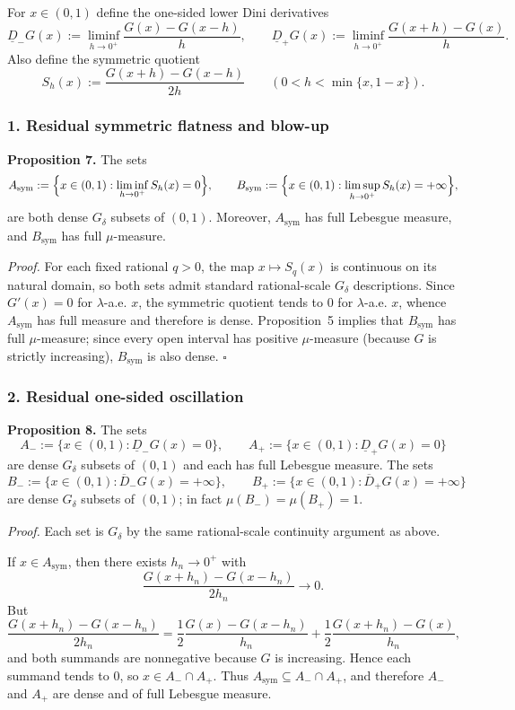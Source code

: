 For $x\in(0,1)$ define the one-sided lower Dini derivatives
\[
\underline D_-G(x):=\liminf_{h\to0^+}\frac{G(x)-G(x-h)}{h},
\qquad
\underline D_+G(x):=\liminf_{h\to0^+}\frac{G(x+h)-G(x)}{h}.
\]
Also define the symmetric quotient
\[
S_h(x):=\frac{G(x+h)-G(x-h)}{2h}
\qquad(0<h<\min\{x,1-x\}).
\]

\subsubsection*{1. Residual symmetric flatness and blow-up}

\noindent\textbf{Proposition 7.}
The sets
\[
A_{\mathrm{sym}}:=\Bigl\{x\in(0,1):\liminf_{h\to0^+}S_h(x)=0\Bigr\},
\qquad
B_{\mathrm{sym}}:=\Bigl\{x\in(0,1):\limsup_{h\to0^+}S_h(x)=+\infty\Bigr\},
\]
are both dense $G_\delta$ subsets of $(0,1)$. Moreover, $A_{\mathrm{sym}}$ has full Lebesgue measure, and $B_{\mathrm{sym}}$ has full $\mu$-measure.

\medskip
\noindent\textit{Proof.}
For each fixed rational $q>0$, the map $x\mapsto S_q(x)$ is continuous on its natural domain, so both sets admit standard rational-scale $G_\delta$ descriptions. Since $G'(x)=0$ for $\lambda$-a.e. $x$, the symmetric quotient tends to $0$ for $\lambda$-a.e. $x$, whence $A_{\mathrm{sym}}$ has full measure and therefore is dense. Proposition~5 implies that $B_{\mathrm{sym}}$ has full $\mu$-measure; since every open interval has positive $\mu$-measure (because $G$ is strictly increasing), $B_{\mathrm{sym}}$ is also dense. \hfill$\square$

\subsubsection*{2. Residual one-sided oscillation}

\noindent\textbf{Proposition 8.}
The sets
\[
A_-:=\{x\in(0,1):\underline D_-G(x)=0\},
\qquad
A_+:=\{x\in(0,1):\underline D_+G(x)=0\}
\]
are dense $G_\delta$ subsets of $(0,1)$ and each has full Lebesgue measure.
The sets
\[
B_-:=\{x\in(0,1):\overline D_-G(x)=+\infty\},
\qquad
B_+:=\{x\in(0,1):\overline D_+G(x)=+\infty\}
\]
are dense $G_\delta$ subsets of $(0,1)$; in fact $\mu(B_-)=\mu(B_+)=1$.

\medskip
\noindent\textit{Proof.}
Each set is $G_\delta$ by the same rational-scale continuity argument as above.

If $x\in A_{\mathrm{sym}}$, then there exists $h_n\to0^+$ with
\[
\frac{G(x+h_n)-G(x-h_n)}{2h_n}\to0.
\]
But
\[
\frac{G(x+h_n)-G(x-h_n)}{2h_n}
=
\frac12\frac{G(x)-G(x-h_n)}{h_n}
+
\frac12\frac{G(x+h_n)-G(x)}{h_n},
\]
and both summands are nonnegative because $G$ is increasing. Hence each summand tends to $0$, so $x\in A_-\cap A_+$. Thus $A_{\mathrm{sym}}\subseteq A_-\cap A_+$, and therefore $A_-$ and $A_+$ are dense and of full Lebesgue measure.

